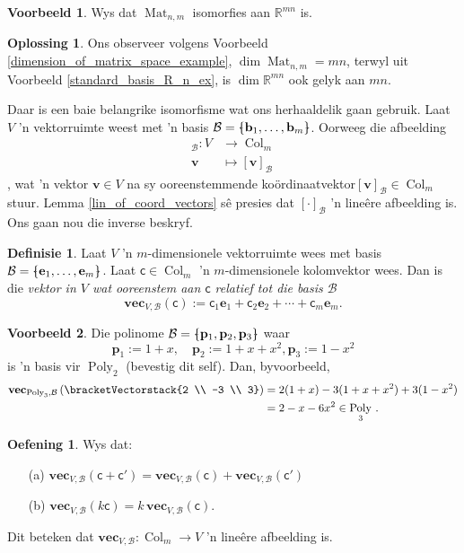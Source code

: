 \documentclass[a4paper,11pt]{book}
\theoremstyle{definition}
\newtheorem{definition}[theorem]{Definisie}
\newtheorem{exercise}{Oefening}
\newtheorem{example_environment}{Voorbeeld}[chapter]
\newtheorem*{solution}{Oplossing}
\newcommand{\ve}[1]{\mathbf{#1}}
\newcommand{\mat}[1]{\mathsf{#1}}
\newcommand{\basis}[1]{{\mathcal #1}}
\newcommand{\cvector}[1]{\bracketVectorstack{#1}}
\newenvironment{example}
	{
		\begin{oframed}
		\begin{example_environment}
	}
	{
		\end{example_environment}
		\end{oframed}
	}
\newcommand{\bmark}{\raisebox{.53ex}{\rule{.2em}{.1ex}}}
\newcommand{\bopen}{{\protect\ooalign{\{\cr\hfil\bmark\hfil\cr}}}
\newcommand{\bclose}{{\protect\ooalign{\}\cr\hfil\bmark\hfil\cr}}}
\DeclareMathOperator{\Poly}{Poly}
\DeclareMathOperator{\Mat}{Mat}
\DeclareMathOperator{\Col}{Col}
\begin{document}
\begin{example} Wys dat $\Mat_{n,m}$ isomorfies aan $\mathbb{R}^{mn}$ is.
	\begin{solution} Ons observeer volgens Voorbeeld
		\ref{dimension_of_matrix_space_example}, $\dim \Mat_{n,m} = mn$,
		terwyl uit Voorbeeld \ref{standard_basis_R_n_ex}, is $\dim
		\mathbb{R}^{mn}$ ook gelyk aan $mn$. 
	\end{solution}
\end{example}
Daar is een baie belangrike isomorfisme wat ons herhaaldelik gaan gebruik.
Laat $V$ 'n vektorruimte weest met 'n basis $\basis{B} = \bopen \ve{b}_1,
\ldots, \ve{b}_m \bclose$. Oorweeg die afbeelding
\begin{align*}
	[ \cdot ]_\basis{B} : V & \rightarrow \Col_m  \\
	\ve{v} & \mapsto [\ve{v}]_\basis{B} 
\end{align*}
, wat 'n vektor $\ve{v} \in V$ na sy ooreenstemmende
ko{\"o}rdinaatvektor$[\ve{v}]_\basis{B} \in \Col_m$ stuur. Lemma
\ref{lin_of_coord_vectors} s{\^e} presies dat $[ \cdot ]_\basis{B}$ 'n
line{\^e}re afbeelding is. Ons gaan nou die inverse beskryf.

\begin{definition} Laat $V$ 'n $m$-dimensionele vektorruimte wees met basis
	$\basis{B} = \bopen \ve{e}_1, \ldots, \ve{e}_m\bclose$. Laat $\mat{c}
	\in \Col_m$ 'n $m$-dimensionele kolomvektor wees. Dan is die
	\emph{vektor in $V$ wat ooreenstem aan $\mat{c}$ relatief tot die basis
	$\basis{B}$}
	\[
		\ve{vec}_{V, \basis{B}} (\mat{c}) := \mat{c}_1 \ve{e}_1 + \mat{c}_2
		\ve{e}_2 + \cdots + \mat{c}_m \ve{e}_m.
	\]
\end{definition}
\begin{example} Die polinome $\basis{B} = \bopen \ve{p}_1, \ve{p}_2,
	\ve{p}_3 \bclose$ waar
	\[
		\ve{p}_1 := 1 + x, \quad \ve{p}_2 := 1 + x + x^2, \ve{p}_3 :=
		1-x^2
	\]
	is 'n basis vir $\Poly_2$ (bevestig dit self). Dan, byvoorbeeld,
	\begin{align*}
		\ve{vec}_{\Poly_3, \basis{B}} \left( \cvector{2 \\ -3 \\ 3} \right)
		&= 2(1+x) -3 (1+x+x^2) + 3(1-x^2) \\
		&=  2 -x -6x^2 \in \Poly_3 \, . 
	\end{align*}
\end{example}
\begin{exercise} Wys dat:
	\begin{itemize}
		\item[(a)]  $\ve{vec}_{V, \basis{B}} (\mat{c} + \mat{c}') =
			\ve{vec}_{V, \basis{B}} (\mat{c}) + \ve{vec}_{V, \basis{B}}
			(\mat{c}')$
		\item[(b)] $\ve{vec}_{V, \basis{B}} (k\mat{c}) = k \, \ve{vec}_{V,
			\basis{B}} (\mat{c})$.
	\end{itemize}
	Dit beteken dat $\ve{vec}_{V, \basis{B}} : \Col_m \rightarrow V$ 'n
	line{\^e}re afbeelding is.
\end{exercise}
\end{document}
